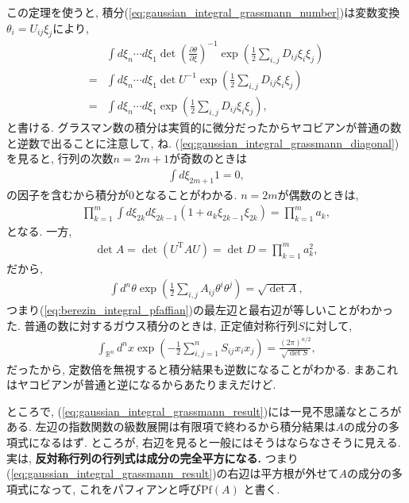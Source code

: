 \documentclass{ltjsarticle}
\theoremstyle{definition}
\begin{document}
この定理を使うと, 積分(\ref{eq:gaussian_integral_grassmann_number})は変数変換$\theta_i=U_{ij}\xi_j$により,
\begin{align}
  &\int d\xi_n\cdots d\xi_1\det\left(\frac{\partial\theta}{\partial\xi}\right)^{-1}\exp\left(\frac12\sum_{i,j}D_{ij}\xi_i\xi_j\right)\\
  =&\int d\xi_n\cdots d\xi_1\det U^{-1}\exp\left(\frac12\sum_{i,j}D_{ij}\xi_i\xi_j\right)\\
  =&\int d\xi_n\cdots d\xi_1\exp\left(\frac12\sum_{i,j}D_{ij}\xi_i\xi_j\right),\label{eq:gaussian_integral_grassmann_diagonal}
\end{align}
と書ける. グラスマン数の積分は実質的に微分だったからヤコビアンが普通の数と逆数で出ることに注意して, ね. (\ref{eq:gaussian_integral_grassmann_diagonal})を見ると, 行列の次数$n=2m+1$が奇数のときは
\begin{gather}
  \int d\xi_{2m+1}1=0,
\end{gather}
の因子を含むから積分が0となることがわかる. $n=2m$が偶数のときは,
\begin{gather}
  \prod_{k=1}^m\int d\xi_{2k}d\xi_{2k-1}(1+a_k\xi_{2k-1}\xi_{2k})=\prod_{k=1}^ma_k,
\end{gather}
となる. 一方,
\begin{gather}
  \det A=\det(U^{\mathrm T}AU)=\det D=\prod_{k=1}^ma_k^2,
\end{gather}
だから, 
\begin{gather}
  \int d^n\theta\exp\left(\frac12\sum_{i,j}A_{ij}\theta^i\theta^j\right)=\sqrt{\det A},\label{eq:gaussian_integral_grassmann_result}
\end{gather}
つまり(\ref{eq:berezin_integral_pfaffian})の最左辺と最右辺が等しいことがわかった. 普通の数に対するガウス積分のときは, 正定値対称行列$S$に対して,
\begin{gather}
  \int_{\mathbb R^n}d^nx\exp\left(-\frac12\sum_{i,j=1}^nS_{ij}x_ix_j\right)=\frac{(2\pi)^{n/2}}{\sqrt{\det S}},
\end{gather}
だったから, 定数倍を無視すると積分結果も逆数になることがわかる. まあこれはヤコビアンが普通と逆になるからあたりまえだけど.\par
ところで, (\ref{eq:gaussian_integral_grassmann_result})には一見不思議なところがある. 左辺の指数関数の級数展開は有限項で終わるから積分結果は$A$の成分の多項式になるはず. ところが, 右辺を見ると一般にはそうはならなさそうに見える. 実は, \textbf{反対称行列の行列式は成分の完全平方になる.} つまり(\ref{eq:gaussian_integral_grassmann_result})の右辺は平方根が外せて$A$の成分の多項式になって, これをパフィアンと呼び$\mathrm{Pf}(A)$ と書く.\par
\end{document}
